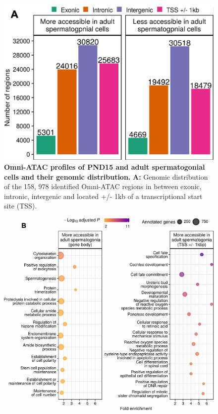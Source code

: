 \documentclass[12pt,twoside]{reedthesis}
\begin{document}
\begin{subfigures}


\begin{figure}[htbp]

{\centering \includegraphics{thesis_files/figure-latex/ds2a-1} 

}

\caption[Omni-ATAC profiles of PND15 and adult spermatogonial cells and their genomic distribution]{\textbf{Omni-ATAC profiles of PND15 and adult spermatogonial cells and their genomic distribution.} \newline \textbf{A:} Genomic distribution of the 158, 978 identified Omni-ATAC regions in between exonic, intronic, intergenic and located +/- 1kb of a transcriptional start site (TSS).}\label{fig:ds2a}
\end{figure}

\begin{figure}[htbp]

{\centering \includegraphics{thesis_files/figure-latex/ds2b-1} 

}
\end{figure}
\end{subfigures}
\end{document}

